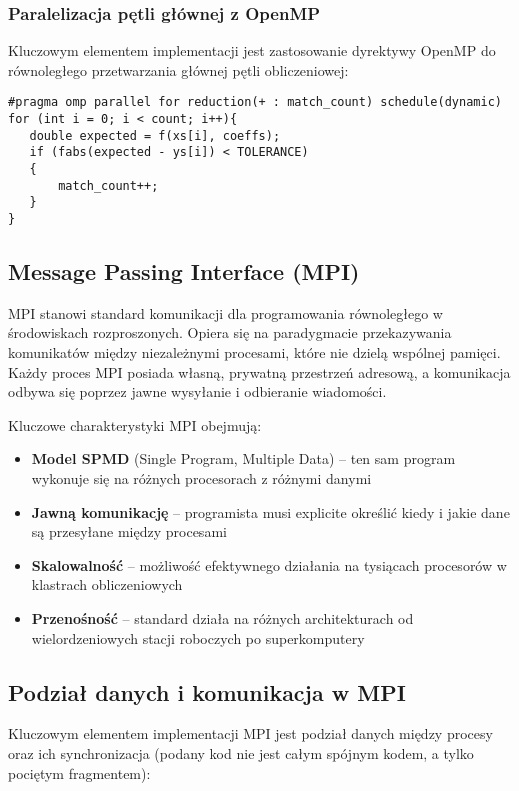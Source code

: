 \documentclass[12pt,a4paper]{report}
\begin{document}
\subsubsection{Paralelizacja pętli głównej z OpenMP}

Kluczowym elementem implementacji jest zastosowanie dyrektywy OpenMP do równoległego przetwarzania głównej pętli obliczeniowej:

\begin{verbatim}
#pragma omp parallel for reduction(+ : match_count) schedule(dynamic)
for (int i = 0; i < count; i++){
   double expected = f(xs[i], coeffs);
   if (fabs(expected - ys[i]) < TOLERANCE)
   {
       match_count++;
   }
}
\end{verbatim}

\subsection{Message Passing Interface (MPI)}

MPI stanowi standard komunikacji dla programowania równoległego w środowiskach rozproszonych. Opiera się na paradygmacie przekazywania komunikatów między niezależnymi procesami, które nie dzielą wspólnej pamięci. Każdy proces MPI posiada własną, prywatną przestrzeń adresową, a komunikacja odbywa się poprzez jawne wysyłanie i odbieranie wiadomości.

Kluczowe charakterystyki MPI obejmują:
\begin{itemize}
    \item \textbf{Model SPMD} (Single Program, Multiple Data) -- ten sam program wykonuje się na różnych procesorach z różnymi danymi
    \item \textbf{Jawną komunikację} -- programista musi explicite określić kiedy i jakie dane są przesyłane między procesami
    \item \textbf{Skalowalność} -- możliwość efektywnego działania na tysiącach procesorów w klastrach obliczeniowych
    \item \textbf{Przenośność} -- standard działa na różnych architekturach od wielordzeniowych stacji roboczych po superkomputery
\end{itemize}

\subsection{Podział danych i komunikacja w MPI}

Kluczowym elementem implementacji MPI jest podział danych między procesy oraz ich synchronizacja (podany kod nie jest całym spójnym kodem, a tylko pociętym fragmentem):
\end{document}
